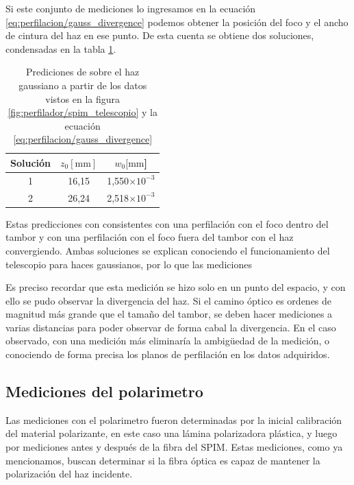 Si este conjunto de mediciones lo ingresamos en la ecuación \ref{eq:perfilacion/gauss_divergence} podemos obtener la posición del foco y el ancho de cintura del haz en ese punto. De esta cuenta se obtiene dos soluciones, condensadas en la tabla \ref{tbl:perfilador/spim_telescopio_predicciones}.

\begin{table}[H]
        \centering
        \begin{tabular}{c|c|c}
            Solución & $z_0[\text{mm}]$ & $w_0[\text{mm}$] \\ \hline
            1 &  16,15 &  1,550$\times10^{-3}$  \\
            2 &  26,24 &  2,518$\times10^{-3}$\\
        \end{tabular}
        \caption{Prediciones de sobre el haz gaussiano a partir de los datos vistos en la figura \ref{fig:perfilador/spim_telescopio} y la ecuación \ref{eq:perfilacion/gauss_divergence}}
        \label{tbl:perfilador/spim_telescopio_predicciones}
\end{table}

Estas predicciones con consistentes con una perfilación con el foco dentro del tambor y con una perfilación con el foco fuera del tambor con el haz convergiendo. Ambas soluciones se explican conociendo el funcionamiento del telescopio para haces gaussianos, por lo que las mediciones  

Es preciso recordar que esta medición se hizo solo en un punto del espacio, y con ello se pudo observar la divergencia del haz. Si el camino óptico es ordenes de magnitud más grande que el tamaño del tambor, se deben hacer mediciones a varias distancias para poder observar de forma cabal la divergencia. En el caso observado, con una medición más eliminaría la ambigüedad de la medición, o conociendo de forma precisa los planos de perfilación en los datos adquiridos.

\subsection{Mediciones del polarimetro}

Las mediciones con el polarimetro fueron determinadas por la inicial calibración del material polarizante, en este caso una lámina polarizadora plástica, y luego por mediciones antes y después de la fibra del SPIM. Estas mediciones, como ya mencionamos, buscan determinar si la fibra óptica es capaz de mantener la polarización del haz incidente.

